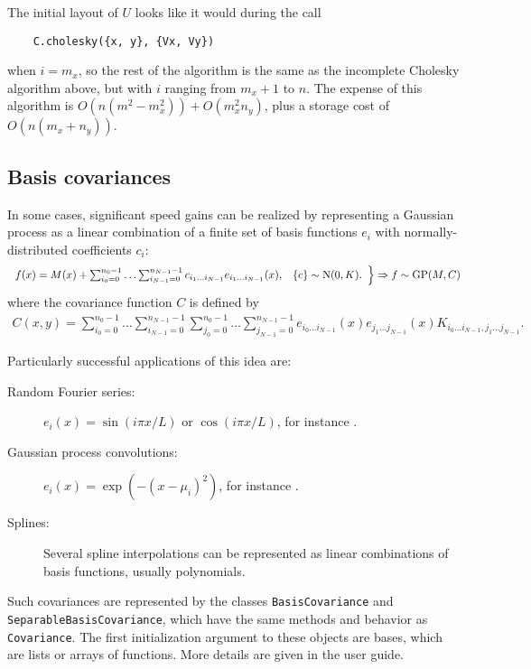 \documentclass{report}
\begin{document}
The initial layout of $U$ looks like it would during the call
\begin{verbatim}
    C.cholesky({x, y}, {Vx, Vy})
\end{verbatim}
when $i=m_x$, so the rest of the algorithm is the same as the incomplete Cholesky algorithm above, but with $i$ ranging from $m_x+1$ to $n$. The expense of this algorithm is $O(n(m^2-m_x^2))+O(m_x^2 n_y)$, plus a storage cost of $O(n(m_x+n_y))$.

\subsection{Basis covariances}\label{sec:basis}

In some cases, significant speed gains can be realized by representing a Gaussian process as a linear combination of a finite set of basis functions $e_i$ with normally-distributed coefficients $c_i$:
\begin{eqnarray*}
    \left.
    \begin{array}{ll}
        f(x) = M(x) + \sum_{i_0=0}^{n_0-1}\ldots \sum_{i_{N-1}=0}^{n_{N-1}-1} c_{i_1\ldots i_{N-1}} e_{i_1\ldots i_{N-1}}(x), &
        \{c\}\sim \textup{N}(0,K).
    \end{array}
    \right\}
    \Rightarrow f \sim \textup{GP}(M,C)
\end{eqnarray*}
where the covariance function $C$ is defined by
\begin{eqnarray*}
    C(x,y)=\sum_{i_0=0}^{n_0-1}\ldots \sum_{i_{N-1}=0}^{n_{N-1}-1} \sum_{j_0=0}^{n_0-1}\ldots \sum_{j_{N-1}=0}^{n_{N-1}-1} e_{i_0\ldots i_{N-1}}(x) e_{j_1\ldots j_{N-1}}(x) K_{i_0\ldots i_{N-1}, j_1\ldots j_{N-1}}.
\end{eqnarray*}

Particularly successful applications of this idea are:
\begin{description}
    \item[Random Fourier series:] $e_i(x) = \sin(i\pi x/L)$ or $\cos(i\pi x/L)$, for instance \cite{spanos}.
    \item[Gaussian process convolutions:] $e_i(x) = \exp(-(x-\mu_i)^2)$, for instance \cite{convolution}.
    \item[Splines:] Several spline interpolations can be represented as linear combinations of basis functions, usually polynomials. \cite{micula, lang_pspline}
\end{description}

Such covariances are represented by the classes \texttt{BasisCovariance} and \texttt{SeparableBasisCovariance}, which have the same methods and behavior as \texttt{Covariance}. The first initialization argument to these objects are bases, which are lists or arrays of functions. More details are given in the user guide.
\end{document}
